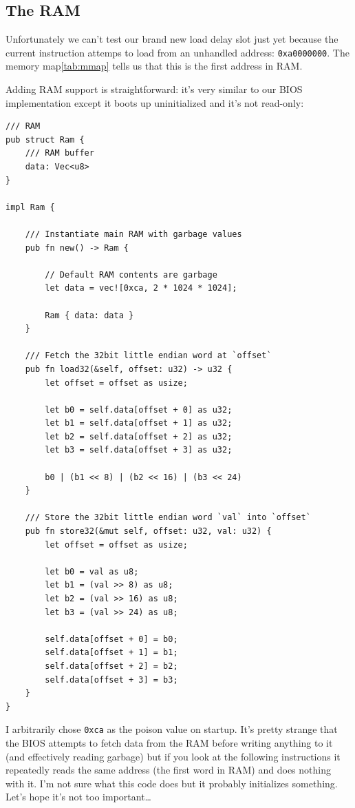 \documentclass[a4paper]{article}
\newcommand{\code}[1] {\texttt{#1}}
\begin{document}
\subsection{The RAM}

\label{sec:ram}

Unfortunately we can't test our brand new load delay slot just yet
because the current instruction attemps to load from an unhandled
address: \code{0xa0000000}. The memory map\ref{tab:mmap} tells us that
this is the first address in RAM.

Adding RAM support is straightforward: it's very similar to our BIOS
implementation except it boots up uninitialized and it's not
read-only:

\begin{lstlisting}
/// RAM
pub struct Ram {
    /// RAM buffer
    data: Vec<u8>
}

impl Ram {

    /// Instantiate main RAM with garbage values
    pub fn new() -> Ram {

        // Default RAM contents are garbage
        let data = vec![0xca, 2 * 1024 * 1024];

        Ram { data: data }
    }

    /// Fetch the 32bit little endian word at `offset`
    pub fn load32(&self, offset: u32) -> u32 {
        let offset = offset as usize;

        let b0 = self.data[offset + 0] as u32;
        let b1 = self.data[offset + 1] as u32;
        let b2 = self.data[offset + 2] as u32;
        let b3 = self.data[offset + 3] as u32;

        b0 | (b1 << 8) | (b2 << 16) | (b3 << 24)
    }

    /// Store the 32bit little endian word `val` into `offset`
    pub fn store32(&mut self, offset: u32, val: u32) {
        let offset = offset as usize;

        let b0 = val as u8;
        let b1 = (val >> 8) as u8;
        let b2 = (val >> 16) as u8;
        let b3 = (val >> 24) as u8;

        self.data[offset + 0] = b0;
        self.data[offset + 1] = b1;
        self.data[offset + 2] = b2;
        self.data[offset + 3] = b3;
    }
}
\end{lstlisting}

I arbitrarily chose \code{0xca} as the poison value on startup. It's pretty
strange that the BIOS attempts to fetch data from the RAM before
writing anything to it (and effectively reading garbage) but if you
look at the following instructions it repeatedly reads the same
address (the first word in RAM) and does nothing with it. I'm not sure
what this code does but it probably initializes something. Let's hope
it's not too important\dots{}
\end{document}
